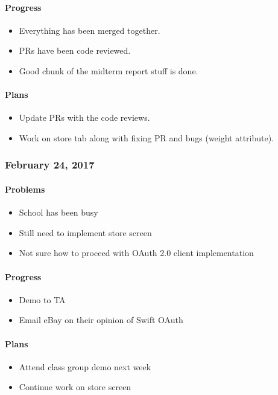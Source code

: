 \paragraph{Progress}\label{progress}
\begin{itemize}
\tightlist
\item
  Everything has been merged together.
\item
  PRs have been code reviewed.
\item
  Good chunk of the midterm report stuff is done.
\end{itemize}
\paragraph{Plans}\label{plans}
\begin{itemize}
\tightlist
\item
  Update PRs with the code reviews.
\item
  Work on store tab along with fixing PR and bugs (weight attribute).
\end{itemize}

\subsubsection{February 24, 2017}\label{section}
\paragraph{Problems}\label{problems}
\begin{itemize}
\tightlist
\item
  School has been busy
\item
  Still need to implement store screen
\item
  Not sure how to proceed with OAuth 2.0 client implementation
\end{itemize}
\paragraph{Progress}\label{progress}
\begin{itemize}
\tightlist
\item
  Demo to TA
\item
  Email eBay on their opinion of Swift OAuth
\end{itemize}
\paragraph{Plans}\label{plans}
\begin{itemize}
\tightlist
\item
  Attend class group demo next week
\item
  Continue work on store screen
\end{itemize}


